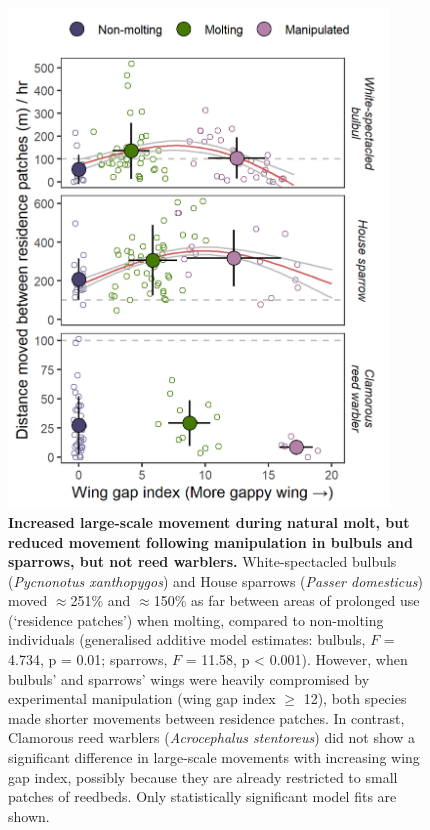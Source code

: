 \begin{refsection}
\begin{figure}[!h]
\centering
\includegraphics[width=0.9\textwidth]{figures/holeybirds/fig_01.png}
\caption{
    \textbf{Increased large-scale movement during natural molt, but reduced movement following manipulation in bulbuls and sparrows, but not reed warblers.}
    White-spectacled bulbuls (\textit{Pycnonotus xanthopygos}) and House sparrows (\textit{Passer domesticus}) moved $\approx$251\% and $\approx$150\% as far between areas of prolonged use (`residence patches') when molting, compared to non-molting individuals (generalised additive model estimates: bulbuls, $F$ = 4.734, p = 0.01; sparrows, $F$ = 11.58, p < 0.001).
    However, when bulbuls' and sparrows' wings were heavily compromised by experimental manipulation (wing gap index $\geq$ 12), both species made shorter movements between residence patches.
    In contrast, Clamorous reed warblers (\textit{Acrocephalus stentoreus}) did not show a significant difference in large-scale movements with increasing wing gap index, possibly because they are already restricted to small patches of reedbeds.
    Only statistically significant model fits are shown.
}\label{fig1}
\end{figure}


\end{refsection}
